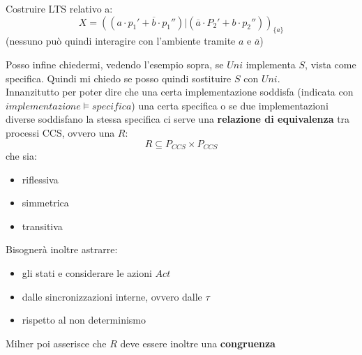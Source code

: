 \documentclass[a4paper,12pt, oneside]{book}
\begin{document}
\begin{esercizio}
  Costruire LTS relativo a:
  \[X=((a\cdot p_1'+\overline{b}\cdot p_1'')|(\overline{a}\cdot P_2'+b\cdot
    p_2''))_{\{a\}}\]
  (nessuno può quindi interagire con l'ambiente tramite $a$ e $\overline{a}$)
  \begin{center}
  \end{center}
\end{esercizio}
Posso infine chiedermi, vedendo l'esempio sopra, se $Uni$ implementa $S$, vista
come specifica. Quindi mi chiedo se posso quindi sostituire $S$ con $Uni$.\\
Innanzitutto per poter dire che una certa implementazione soddisfa (indicata con
$implementazione \vDash specifica$) una certa
specifica o se due implementazioni diverse soddisfano la stessa specifica ci
serve una \textbf{relazione di equivalenza} tra processi CCS, ovvero una $R$:
\[R\subseteq P_{CCS}\times P_{CCS}\]
che sia:
\begin{itemize}
  \item riflessiva
  \item simmetrica
  \item transitiva
\end{itemize}
Bisognerà inoltre astrarre:
\begin{itemize}
  \item gli stati e considerare le azioni $Act$
  \item dalle sincronizzazioni interne, ovvero dalle $\tau$
  \item rispetto al non determinismo
\end{itemize}
Milner poi asserisce che $R$ deve essere inoltre una \textbf{congruenza}
\end{document}
